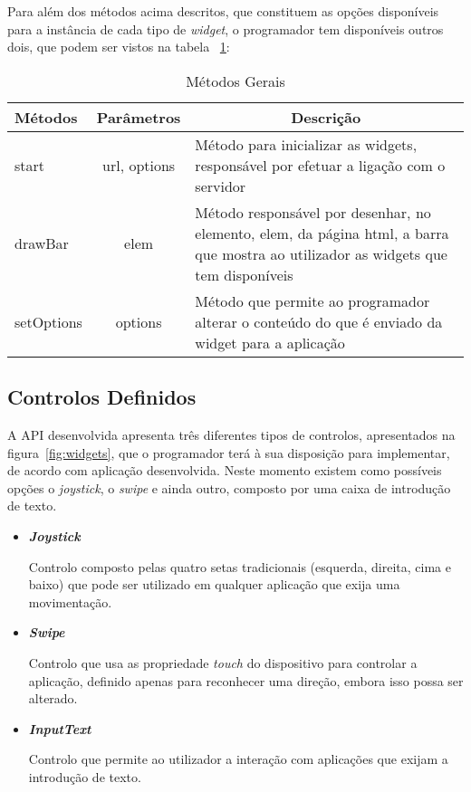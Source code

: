 Para além dos métodos acima descritos, que constituem as opções disponíveis para a instância de cada tipo de \textit{widget}, o programador tem disponíveis outros dois, que podem ser vistos na tabela ~\ref{table:metodos_g}:

\pagebreak

	\begin{table}[ht]
 	\renewcommand{\arraystretch}{1.5}
	\centering
	\caption{Métodos Gerais}
	\begin{tabular}{ p{2cm} p{2cm} p{10cm}  }
	\hline
	\textbf{Métodos} & \multicolumn{1}{c}{\textbf{Parâmetros}} & \multicolumn{1}{c}{\textbf{Descrição}} \\
	\hline
	start & \multicolumn{1}{c}{url, options} &Método para inicializar as widgets, responsável por efetuar a ligação com o servidor \\
	\hline
	drawBar & \multicolumn{1}{c}{elem} &Método responsável por desenhar, no elemento, elem, da página html, a barra que mostra ao utilizador as widgets que tem disponíveis \\
	\hline
	setOptions & \multicolumn{1}{c}{options} &Método que permite ao programador alterar o conteúdo do que é enviado da widget para a aplicação  \\
	\hline
	\end{tabular}
	\label{table:metodos_g}
	\end{table}

\subsection{Controlos Definidos}

	A API desenvolvida apresenta três diferentes tipos de controlos, apresentados na figura~\ref{fig:widgets}, que o programador terá à sua disposição para implementar, de acordo com aplicação desenvolvida. Neste momento existem como possíveis opções o \textit{joystick}, o \textit{swipe} e ainda outro, composto por uma caixa de introdução de texto.

	\begin{itemize}

	\item \textbf{\textit{Joystick}}

		Controlo composto pelas quatro setas tradicionais (esquerda, direita, cima e baixo) que pode ser utilizado em qualquer aplicação que exija uma movimentação.

	\item \textbf{\textit{Swipe}}

		Controlo que usa as propriedade \textit{touch} do dispositivo para controlar a aplicação, definido apenas para reconhecer uma direção, embora isso possa ser alterado.

	\item \textbf{\textit{InputText}}

		Controlo que permite ao utilizador a interação com aplicações que exijam a introdução de texto.

	\end{itemize}

